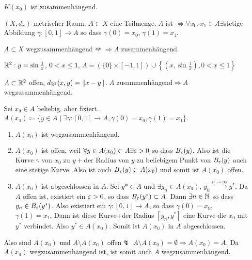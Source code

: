 \begin{bemerkung*}
$ K(x_0) $ ist zusammenh\"angend.
\end{bemerkung*}
\begin{definition}
$ (X,d_x) $ metrischer Raum, $ A\subset X $ eine Teilmenge. $ A $ ist $ \Leftrightarrow\forall x_0,x_1\in A \exists$stetige Abbildung $ \gamma\colon[0,1]\rightarrow A $ so dass $ \gamma(0)=x_0 $, $ \gamma(1)=x_1 $.
\end{definition}
\begin{bemerkung*}
$ A\subset X $ wegzusammenh\"angend$ \nLeftarrow\Rightarrow A$ zusammenh\"angend.
\begin{beispiel*}
$ \mathbb{R}^2: y=\sin\frac{1}{x} $, $ 0<x\leq 1 $, $ A=(\lbrace 0\rbrace\times[-1,1])\cup\left\lbrace\left(x,\sin\frac{1}{x}\right),0<x\leq 1\right\rbrace $
\end{beispiel*}
\end{bemerkung*}
\begin{proposition}
$ A\subset\mathbb{R}^2 $ offen, $ d_{\mathbb{R}^2} (x,y)=\left\|x-y\right\|$. $ A $ zusammenh\"angend$ \Rightarrow A $wegzusammenh\"angend.
\end{proposition}
\begin{beweis}
Sei $ x_0\in A $ beliebig, aber fixiert. $ A(x_0)\coloneqq\lbrace y\in A\mid\exists\gamma\colon[0,1]\rightarrow A, \gamma(0)=x_0,\gamma(1)=x_1\rbrace $.
\begin{enumerate}
\item $ A(x_0) $ ist wegzusammenh\"angend.
\item $ A(x_0) $ ist offen, weil $ \forall y\in A(x_0)\subset A\exists\varepsilon>0 $ so dass $ B_\varepsilon(y) $. Also ist die Kurve $ \gamma $ von $ x_0 $ zu $ y +$der Radius von $ y $ zu beliebigem Punkt von $ B_\varepsilon(y) $ auch eine stetige Kurve. Also ist auch $ B_\varepsilon(y)\subset A(x_0) $ und somit ist $ A(x_0) $ offen.
\item $ A(x_0) $ ist abgeschlossen in $ A $. Sei $ y\ast\in A $ und $ \exists y_n\in A(x_0) $, $ y_n\xrightarrow{n\to\infty}y^\ast $. Da $ A $ offen ist, existiert ein $ \varepsilon>0 $, so dass $ B_\varepsilon(y^\ast)\subset A $. Dann $ \exists n\in\mathbb{N} $ so dass $ y_n\in B_\varepsilon(y^\ast) $. Also existiert ein $ \gamma\colon[0,1]\rightarrow A $, so dass $ \gamma(0)=x_0 $, $ \gamma(1)=x_1 $, Dann ist diese Kurve+der Radius $ [y_n,y^\ast] $ eine Kurve die $ x_0 $ mit $ y^\ast $ verbindet. Also $ y^\ast\in A(x_0) $. Somit ist $ A(x_0) $ in $ A $ abgeschlossen.
\end{enumerate}
Also sind $ A(x_0) $ und $ A\setminus A(x_0) $ offen$ \lightning $ $ A\setminus A(x_0)=\emptyset \Rightarrow A(x_0)=A$. Da $ A(x_0) $ wegzusammenh\"angend ist, ist somit auch $ A $ wegzusammenh\"angend.
\end{beweis}